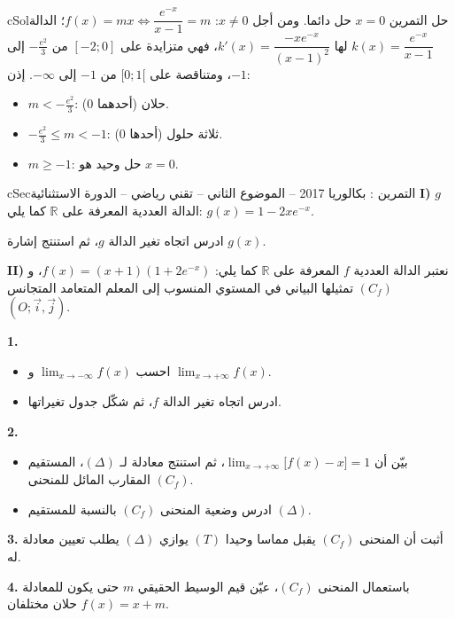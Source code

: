\documentclass[12pt,a4paper]{article}
\newenvironment{BOX}[2]{\begin{otherlanguage}{english}\begin{arbox}{#1}{#2}}{\end{arbox}\end{otherlanguage}}
\newcounter{exo}
\newenvironment{tamrin}[1]{\stepcounter{exo}\begin{BOX}{cSec}{التمرين \theexo: #1}}{\end{BOX}}
\newenvironment{hal}{\Needspace{12\baselineskip}\begin{otherlanguage}{english}\begin{arbox}[breakable]{cSol}{حل التمرين \theexo}}{\end{arbox}\end{otherlanguage}}
\newcommand{\R}{\mathbb{R}}
\newenvironment{sq}{\begin{itemize}[leftmargin=2.4em,itemsep=3pt]}{\end{itemize}}
\newcommand{\qa}{\item[(أ)]}\newcommand{\qb}{\item[(ب)]}\newcommand{\qc}{\item[(جـ)]}\newcommand{\qd}{\item[(د)]}\newcommand{\qe}{\item[(هـ)]}
\newcommand{\QQ}[1]{\par\smallskip\textbf{#1.} }
\begin{document}
\begin{hal}
$x=0$ حل دائما. ومن أجل $x\neq0$: $f(x)=mx\iff \dfrac{e^{-x}}{x-1}=m$؛ الدالة $k(x)=\dfrac{e^{-x}}{x-1}$ لها $k'(x)=\dfrac{-xe^{-x}}{(x-1)^2}$، فهي متزايدة على $[-2;0]$ من $-\frac{e^2}{3}$ إلى $-1$، ومتناقصة على $[0;1[$ من $-1$ إلى $-\infty$. إذن:
\begin{itemize}
\item $m<-\frac{e^2}{3}$: حلان (أحدهما $0$).
\item $-\frac{e^2}{3}\leqslant m<-1$: ثلاثة حلول (أحدها $0$).
\item $m\geqslant-1$: حل وحيد هو $x=0$.
\end{itemize}
\end{hal}
\begin{tamrin}{بكالوريا 2017 -- الموضوع الثاني -- تقني رياضي -- الدورة الاستثنائية}
\textbf{I)} $g$ الدالة العددية المعرفة على $\R$ كما يلي: $g(x)=1-2xe^{-x}$.
\par ادرس اتجاه تغير الدالة $g$، ثم استنتج إشارة $g(x)$.

\textbf{II)} نعتبر الدالة العددية $f$ المعرفة على $\R$ كما يلي: $f(x)=(x+1)\left(1+2e^{-x}\right)$،
و $(C_f)$ تمثيلها البياني في المستوي المنسوب إلى المعلم المتعامد المتجانس $(O;\vec i,\vec j)$.
\QQ{1}
\begin{sq}
\qa احسب $\displaystyle\lim_{x\to-\infty}f(x)$ و $\displaystyle\lim_{x\to+\infty}f(x)$.
\qb ادرس اتجاه تغير الدالة $f$، ثم شكّل جدول تغيراتها.
\end{sq}
\QQ{2}
\begin{sq}
\qa بيّن أن $\displaystyle\lim_{x\to+\infty}\big[f(x)-x\big]=1$، ثم استنتج معادلة لـ $(\Delta)$، المستقيم المقارب المائل للمنحنى $(C_f)$.
\qb ادرس وضعية المنحنى $(C_f)$ بالنسبة للمستقيم $(\Delta)$.
\end{sq}
\QQ{3} أثبت أن المنحنى $(C_f)$ يقبل مماسا وحيدا $(T)$ يوازي $(\Delta)$ يطلب تعيين معادلة له.
\QQ{4} باستعمال المنحنى $(C_f)$، عيّن قيم الوسيط الحقيقي $m$ حتى يكون للمعادلة $f(x)=x+m$ حلان مختلفان.
\end{tamrin}
\end{document}
